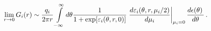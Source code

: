 \begin{equation}
\lim\limits_{r\rightarrow 0}G_{i}(r)\sim \frac{q_{i}}{2\pi r}%
\int\limits_{-\infty }^{\infty }d\theta \frac{1}{1+\exp [\varepsilon
_{i}(\theta ,r,0)]}\left. \frac{d\varepsilon _{i}(\theta ,r,\mu _{i}/2)}{%
d\mu _{i}}\right\vert _{\mu _{i}=0}\frac{d\epsilon (\theta )\,}{d\theta }\,.
\end{equation}%
